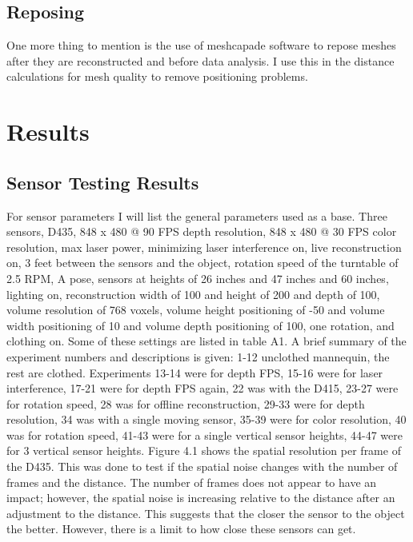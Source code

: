 \section{Reposing}
One more thing to mention is the use of meshcapade software to repose meshes after they are reconstructed and before data analysis. I use this in the distance calculations for mesh quality to remove positioning problems.
\chapter{Results}
\section{Sensor Testing Results}
For sensor parameters I will list the general parameters used as a base. Three sensors, D435, 848 x 480 @ 90 FPS depth resolution, 848 x 480 @ 30 FPS color resolution, max laser power, minimizing laser interference on, live reconstruction on, 3 feet between the sensors and the object, rotation speed of the turntable of 2.5 RPM, A pose, sensors at heights of 26 inches and 47 inches and 60 inches, lighting on, reconstruction width of 100 and height of 200 and depth of 100, volume resolution of 768 voxels, volume height positioning of -50 and volume width positioning of 10 and volume depth positioning of 100, one rotation, and clothing on. Some of these settings are listed in table A1. A brief summary of the experiment numbers and descriptions is given: 1-12 unclothed mannequin, the rest are clothed. Experiments 13-14 were for depth FPS, 15-16 were for laser interference, 17-21 were for depth FPS again, 22 was with the D415, 23-27 were for rotation speed, 28 was for offline reconstruction, 29-33 were for depth resolution, 34 was with a single moving sensor, 35-39 were for color resolution, 40 was for rotation speed, 41-43 were for a single vertical sensor heights, 44-47 were for 3 vertical sensor heights. 
Figure 4.1 shows the spatial resolution per frame of the D435. This was done to test if the spatial noise changes with the number of frames and the distance. The number of frames does not appear to have an impact; however, the spatial noise is increasing relative to the distance after an adjustment to the distance. This suggests that the closer the sensor to the object the better. However, there is a limit to how close these sensors can get.
